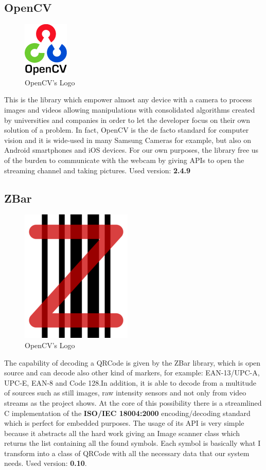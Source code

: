 \subsection{OpenCV}
\begin{figure}[hbt]
    \centering
    \includegraphics[scale=0.5]{img/opencv.png}
    \caption{OpenCV's Logo}
\end{figure}
This is the library which empower almost any device with a camera to process images and videos allowing manipulations with consolidated algorithms created by universities and companies in order to let the developer focus on their own solution of a problem. In fact, OpenCV is the de facto standard for computer vision and it is wide-used in many Samsung Cameras for example, but also on Android smartphones and iOS devices. For our own purposes, the library free us of the burden to communicate with the webcam by giving APIs to open the streaming channel and taking pictures. 
\newline Used version: \textbf{2.4.9}

\subsection{ZBar}
\begin{figure}[hbt]
    \centering
    \includegraphics[scale=0.5]{img/zbar.png}
    \caption{OpenCV's Logo}
\end{figure}
The capability of decoding a QRCode is given by the ZBar library, which is open source and can decode also other kind of markers, for example: EAN-13/UPC-A, UPC-E, EAN-8 and Code 128.In addition, it is able to decode from a multitude of sources such as still images, raw intensity sensors and not only from video streams as the project shows. At the core of this possibility there is a streamlined C implementation of the \textbf{ISO/IEC 18004:2000} encoding/decoding standard which is perfect for embedded purposes.
The usage of its API is very simple because it abstracts all the hard work giving an Image scanner class which returns the list containing all the found symbols. Each symbol is basically what I transform into a class of QRCode with all the necessary data that our system needs.
\newline Used version: \textbf{0.10}.

